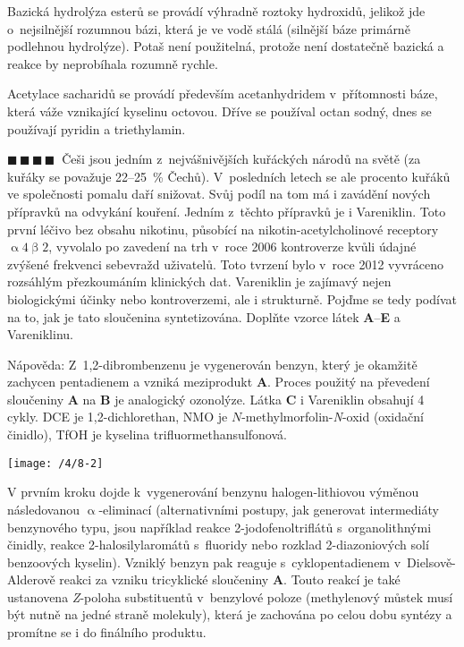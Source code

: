 \documentclass{book}
\newcommand{\ctyri}{$\blacksquare \, \blacksquare \, \blacksquare \, \blacksquare \; \; $}
\renewenvironment{quotation}{\par}{\par} %
\begin{document}
Bazická hydrolýza esterů se provádí výhradně roztoky hydroxidů, jelikož
jde o~nejsilnější rozumnou bázi, která je ve vodě stálá (silnější
báze primárně podlehnou hydrolýze). Potaš není použitelná, protože
není dostatečně bazická a reakce by neprobíhala rozumně rychle. 

Acetylace sacharidů se provádí především acetanhydridem v~přítomnosti
báze, která váže vznikající kyselinu octovou. Dříve se používal octan
sodný, dnes se používají pyridin a triethylamin.

\newpage %
\begin{quotation}
\ctyri Češi jsou jedním z~nejvášnivějších kuřáckých národů na světě (za kuřáky
se považuje 22--25~\% Čechů). V~posledních letech se ale procento
kuřáků ve společnosti pomalu daří snižovat. Svůj podíl na tom má i
zavádění nových přípravků na odvykání kouření. Jedním z~těchto přípravků
je i Vareniklin. Toto první léčivo bez obsahu nikotinu, působící na
nikotin-acetylcholinové receptory $\upalpha4\upbeta2$, vyvolalo po zavedení
na trh v~roce 2006 kontroverze kvůli údajné zvýšené frekvenci sebevražd
uživatelů. Toto tvrzení bylo v~roce 2012 vyvráceno rozsáhlým přezkoumáním
klinických dat. Vareniklin je zajímavý nejen biologickými účinky nebo
kontroverzemi, ale i strukturně. Pojďme se tedy podívat na to, jak
je tato sloučenina syntetizována. Doplňte vzorce látek \textbf{A}--\textbf{E} a Vareniklinu.

Nápověda: Z~1,2-dibrombenzenu je vygenerován benzyn, který je okamžitě
zachycen pentadienem a vzniká meziprodukt \textbf{A}. Proces použitý na převedení
sloučeniny \textbf{A} na \textbf{B} je analogický ozonolýze. Látka \textbf{C} i Vareniklin obsahují
4 cykly. DCE je 1,2-dichlorethan, NMO je $N$-methylmorfolin-\textit{N}-oxid
(oxidační činidlo), TfOH je kyselina trifluormethansulfonová.
\end{quotation} \dotfill \par 
\noindent \begin{center}

\texttt{[image: /4/8-2]}

\par\end{center}

V prvním kroku dojde k~vygenerování benzynu halogen-lithiovou výměnou
následovanou $\upalpha$-eliminací (alternativními postupy, jak generovat
intermediáty benzynového typu, jsou například reakce 2-jodofenol\-triflátů
s~organolithnými činidly, reakce 2-halosilyl\-aromátů s~fluoridy
nebo rozklad 2-diazoniových solí benzoových kyselin). Vzniklý benzyn
pak reaguje s~cyklopentadienem v~Dielsově-Al\-de\-ro\-vě reakci za
vzniku tricyklické sloučeniny \textbf{A}. Touto reakcí je také ustanovena \textit{Z}-poloha substituentů v~benzylové poloze (methylenový můstek musí být
nutně na jedné straně molekuly), která je zachována po celou dobu
syntézy a promítne se i do finálního produktu.
\end{document}
